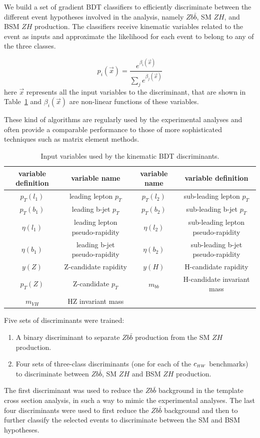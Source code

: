 We build a set of gradient BDT classifiers to efficiently discriminate
between the different event hypotheses involved in the analysis, namely $Z b\bar{b}$,
SM $Z H$, and BSM $Z H$ production. 
The classifiers receive kinematic variables related to the event as inputs and approximate
the likelihood for each event to belong to any of the three classes.

\begin{equation}
p_{i}(\vec x) = \frac{ e^{\beta_{i}(\vec x) } }{ \sum_j e^{\beta_{j}(\vec x) } }
\end{equation}
here $\vec x$ represents all the input variables to the discriminant, that are shown in
Table~\ref{tab:bdt_features} and $\beta_{i}(\vec x)$ are non-linear functions of these
variables.

These kind of algorithms are regularly used by the experimental analyses and often provide a comparable performance to those of more sophisticated techniques such as matrix element methods. 
%
\begin{table}[h!]
\centering
\begin{tabular}{||c|c||c|c||}
variable definition & variable name &  variable name & variable definition \\
\hline
$p_T(l_1)$ & leading lepton $p_T$ & $p_T(l_2)$ & sub-leading lepton $p_T$\\
$p_T(b_1)$ & leading b-jet $p_T$ & $p_T(b_2)$ & sub-leading b-jet $p_T$\\
$\eta(l_1)$ & leading lepton pseudo-rapidity & $\eta(l_2)$ & sub-leading lepton pseudo-rapidity\\
$\eta(b_1)$ & leading b-jet pseudo-rapidity  & $\eta(b_2)$ & sub-leading b-jet  pseudo-rapidity\\
$y(Z)$ & Z-candidate rapidity  & $y(H)$ & H-candidate rapidity \\
$p_T(Z)$ & Z-candidate $p_T$  & $m_{bb}$ & H-candidate invariant mass \\
$m_{VH}$ & HZ invariant mass  &  &  \\
\end{tabular}
\caption{
\label{tab:bdt_features}
Input variables used by the kinematic BDT discriminants.
}
\end{table}

Five sets of discriminants were trained:
\begin{enumerate}
\item A binary discriminant to separate $Z b\bar{b}$ production from the SM $Z H$ production.
\item Four sets of three-class discriminants (one for each of the $c_{\scriptscriptstyle HW}$ benchmarks) to
    discriminate between $Z b\bar{b}$, SM $Z H$ and BSM $Z H$ production.
\end{enumerate}
The first discriminant was used to reduce the $Z b\bar{b}$ background in the template
cross section analysis, in such a way to mimic the experimental analyses.
The last four discriminants were used to first reduce the $Z b\bar{b}$ background and then to further classify the selected events to discriminate between the SM and BSM hypotheses.

